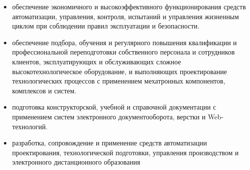 \begin{enumerate}
\begin{itemize}[nosep]
    \item обеспечение экономичного и высокоэффективного функционирования средств
    автоматизации, управления, контроля, испытаний и управления жизненным циклом
    при соблюдении правил эксплуатации и безопасности.
    
    \item обеспечение подбора, обучения и регулярного повышения квалификации и
    профессиональной переподготовки собственного персонала и сотрудников
    клиентов, эксплуатирующих и обслуживающих сложное высокотехнологическое
    оборудование, и выполняющих проектирование технологических процессов с
    применением мехатронных компонентов, комплексов и систем.
    
    \item подготовка конструкторской, учебной и справочной документации с
    применением систем электронного документооборота, верстки и Web-технологий.
    
    \item разработка, сопровождение и применение средств автоматизации
    проектирования, технологической подготовки, управления производством и
    электронного дистанционного образования
     
  \end{itemize}
\end{enumerate}